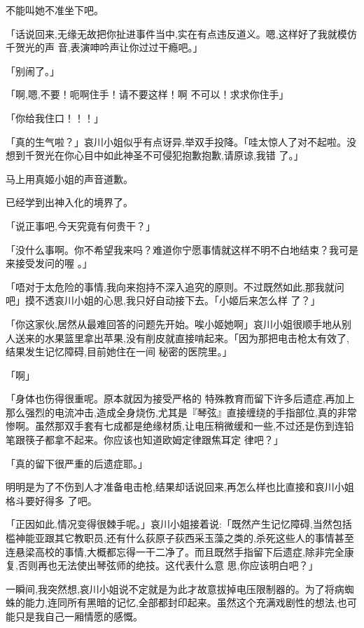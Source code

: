 \documentclass{article}
\begin{document}
不能叫她不准坐下吧。 

「话说回来,无缘无故把你扯进事件当中,实在有点违反道义。嗯,这样好了我就模仿千贺光的声
音,表演呻吟声让你过过干瘾吧。」 


「别闹了。」 

「啊,嗯,不要！呃啊住手！请不要这样！啊
不可以！求求你住手」 


「你给我住口！！！」 

「真的生气啦？」哀川小姐似乎有点讶异,举双手投降。「哇太惊人了对不起啦。没想到千贺光在你心目中如此神圣不可侵犯抱歉抱歉,请原谅,我错
了。」 


马上用真姬小姐的声音道歉。 


\newpage

已经学到出神入化的境界了。 


「说正事吧,今天究竟有何贵干？」 

「没什么事啊。你不希望我来吗？难道你宁愿事情就这样不明不白地结束？我可是来接受发问的喔
。」 

「唔对于太危险的事情,我向来抱持不深入追究的原则。不过既然如此,那我就问吧」摸不透哀川小姐的心思,我只好自动接下去。「小姬后来怎么样
了？」 

「你这家伙,居然从最难回答的问题先开始。唉小姬她啊」哀川小姐很顺手地从别人送来的水果篮里拿出苹果,没有削皮就直接啃起来。「因为那把电击枪太有效了,结果发生记忆障碍,目前她住在一间
秘密的医院里。」 


「啊」 

「身体也伤得很重呢。原本就因为接受严格的
\newpage
特殊教育而留下许多后遗症,再加上那么强烈的电流冲击,造成全身烧伤,尤其是『琴弦』直接缠绕的手指部位,真的非常惨啊。虽然那双手套有七成都是绝缘材质,让电压稍微缓和一些,不过还是伤到连铅笔跟筷子都拿不起来。你应该也知道欧姆定律跟焦耳定
律吧？」 


「真的留下很严重的后遗症耶。」 

明明是为了不伤到人才准备电击枪,结果却话说回来,再怎么样也比直接和哀川小姐格斗要好得多
了吧。 

「正因如此,情况变得很棘手呢。」哀川小姐接着说:「既然产生记忆障碍,当然包括槛神能亚跟其它教职员,还有什么荻原子荻西采玉藻之类的,杀死这些人的事情甚至连悬梁高校的事情,大概都忘得一干二净了。而且既然手指留下后遗症,除非完全康复,否则再也无法使出琴弦师的绝技。这代表什么意
思,你应该明白吧？」 

\newpage

一瞬间,我突然想,哀川小姐说不定就是为此才故意拔掉电压限制器的。为了将病蜘蛛的能力,连同所有黑暗的记忆,全部都封印起来。虽然这个充满戏剧性的想法,也可能只是我自己一厢情愿的感慨。
\end{document}
